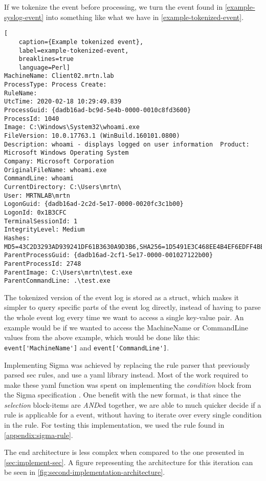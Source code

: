 If we tokenize the event before processing, we turn the event found in \cref{example-syslog-event} into something like what we have in \cref{example-tokenized-event}.
\begin{lstlisting}[
    caption={Example tokenized event},
    label=example-tokenized-event,
    breaklines=true
    language=Perl]
MachineName: Client02.mrtn.lab
ProcessType: Process Create: 
RuleName:   
UtcTime: 2020-02-18 10:29:49.839
ProcessGuid: {dadb16ad-bc9d-5e4b-0000-0010c8fd3600}
ProcessId: 1040
Image: C:\Windows\System32\whoami.exe
FileVersion: 10.0.17763.1 (WinBuild.160101.0800)
Description: whoami - displays logged on user information  Product: Microsoft Windows Operating System
Company: Microsoft Corporation 
OriginalFileName: whoami.exe
CommandLine: whoami
CurrentDirectory: C:\Users\mrtn\
User: MRTNLAB\mrtn
LogonGuid: {dadb16ad-2c2d-5e17-0000-0020fc3c1b00}
LogonId: 0x1B3CFC
TerminalSessionId: 1
IntegrityLevel: Medium
Hashes: MD5=43C2D3293AD939241DF61B3630A9D3B6,SHA256=1D5491E3C468EE4B4EF6EDFF4BBC7D06EE83180F6F0B1576763EA2EFE049493A,IMPHASH=7FF0758B766F747CE57DFAC70743FB88
ParentProcessGuid: {dadb16ad-2cf1-5e17-0000-001027122b00}
ParentProcessId: 2748
ParentImage: C:\Users\mrtn\test.exe
ParentCommandLine: .\test.exe
\end{lstlisting}
The tokenized version of the event log is stored as a struct, which makes it simpler to query specific parts of the event log directly, instead of having to parse the whole event log every time we want to access a single key-value pair. An example would be if we wanted to access the MachineName or CommandLine values from the above example, which would be done like this:  \lstinline{event['MachineName']} and \lstinline{event['CommandLine']}.

Implementing Sigma was achieved by replacing the rule parser that previously parsed \acrshort{sec} rules, and use a \acrshort{yaml} library instead. Most of the work required to make these \acrshort{yaml} function was spent on implementing the \textit{condition} block from the Sigma specification \cite{SigmaSpecification}.
One benefit with the new format, is that since the \textit{selection} block-items are \textit{AND}ed together, we are able to much quicker decide if a rule is applicable for a event, without having to iterate over every single condition in the rule. For testing this implementation, we used the rule found in \cref{appendix:sigma-rule}.

The end architecture is less complex when compared to the one presented in \cref{sec:implement-sec}. A figure representing the architecture for this iteration can be seen in \cref{fig:second-implementation-architecture}.


